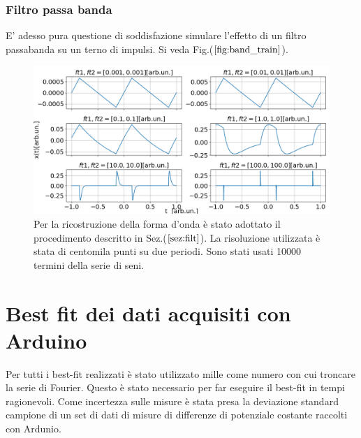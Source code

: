 \documentclass{article}
\begin{document}
            \subsubsection{Filtro passa banda}
                E' adesso pura questione di soddisfazione simulare l'effetto
                di un filtro passabanda su un terno di impulsi. Si veda Fig.($\ref{fig:band_train}$).
                \begin{figure}[H]
                    \centering
                    \includegraphics[width=1\textwidth]{band_train.png} %
                    \caption{Per la ricostruzione della forma d'onda è stato adottato 
                    il procedimento descritto in Sez.($\ref{sez:filt}$).
                    La risoluzione utilizzata è stata di centomila punti su due periodi.
                    Sono stati usati 10000 termini della serie di seni.}
                    \label{fig:band_train}
                \end{figure}


\section{Best fit dei dati acquisiti con Arduino}
    Per tutti i best-fit realizzati è stato utilizzato mille come numero con cui 
    troncare la serie di Fourier. Questo è stato necessario per far eseguire il 
    best-fit in tempi ragionevoli.
    Come incertezza sulle misure è stata
    presa la deviazione standard campione di un set di dati di misure
    di differenze di potenziale costante raccolti con Ardunio.
    
\end{document}

